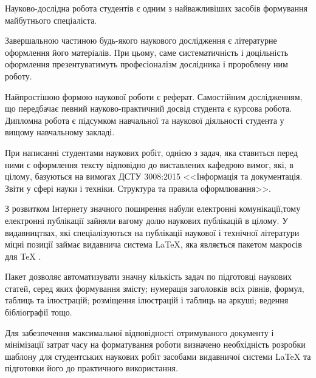 
Науково-дослідна робота студентів є одним з найважливіших засобів формування майбутнього спеціаліста.

Завершальною частиною будь-якого наукового дослідження є літературне оформлення його матеріалів. При цьому, саме систематичність і доцільність оформлення презентуватимуть професіоналізм дослідника і пророблену ним роботу.

Найпростішою формою наукової роботи є реферат. Самостійним   дослідженням, що передбачає певний науково-практичний досвід студента є курсова робота. Дипломна робота є підсумком навчальної та  наукової діяльності студента у вищому навчальному закладі.

При написанні студентами наукових робіт, однією з задач, яка ставиться перед ними є оформлення тексту відповідно до виставлених кафедрою вимог, які, в цілому, базуються на вимогах ДСТУ 3008:2015 <<Інформація та документація. Звіти у сфері науки і техніки. Структура та правила оформлювання>>.

З розвитком Інтернету значного поширення набули електронні комунікації,тому електронні публікації зайняли вагому долю наукових публікацій в цілому. У видавництвах, які спеціалізуються на публікації наукової і технічної літератури міцні позиції займає видавнича система  \LaTeX{}, яка являється пакетом макросів для \TeX{} \cite{Knuth1984TheTeXbook}.

Пакет дозволяє автоматизувати значну кількість задач по підготовці наукових статей, серед яких формування змісту; нумерація заголовків всіх рівнів, формул, таблиць та ілюстрацій; розміщення ілюстрацій і таблиць на аркуші; ведення бібліографії тощо.

Для забезпечення максимальної відповідності отримуваного документу і мінімізації затрат часу на форматування роботи визначено необхідність розробки шаблону для студентських наукових робіт засобами видавничої системи \LaTeX{} та підготовки його до практичного використання.